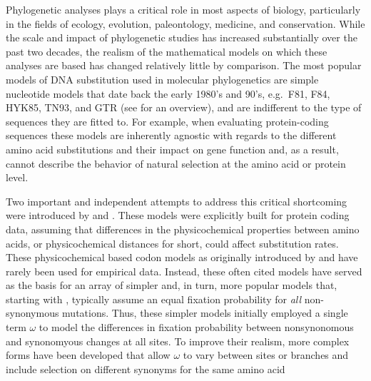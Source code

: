 \documentclass[12pt,letterpaper,fleqn]{article}
\renewcommand{\subsection}[1]{%
\bigskip
\begin{center}
\begin{large}
\normalfont\itshape #1
\end{large}
\end{center}}
\newcommand{\PC}{physicochemical\xspace}
\begin{document}
Phylogenetic analyses plays a critical role in most aspects of biology, particularly in the fields of ecology, evolution, paleontology, medicine, and conservation.
While the scale and impact of phylogenetic studies has increased substantially over the past two decades, the realism of the mathematical models on which these analyses are based has changed relatively little by comparison.
The most popular models of DNA substitution used in molecular phylogenetics are simple nucleotide models that date back the early 1980's and 90's, e.g.~F81, F84, HYK85, TN93, and GTR (see \citet{Yang2014} for an overview),  and are indifferent to the type of sequences they are fitted to.
For example, when evaluating protein-coding sequences these models are inherently agnostic with regards to the different amino acid substitutions and their impact on gene function and, as a result, cannot describe the behavior of natural selection at the amino acid or protein level.

Two important and independent attempts to address this critical shortcoming were introduced by \citet{GoldmanAndYang1994} and \citet{MuseAndGaut1994}.
These models were explicitly built for protein coding data, assuming that differences in the \PC properties between amino acids, or \PC distances for short, could affect substitution rates.
These \PC based codon models as originally introduced by \citet{GoldmanAndYang1994} and \citet{MuseAndGaut1994} have rarely been used for empirical data.
Instead, these often cited models have served as the basis for an array of simpler and, in turn, more popular models that, starting with \citet{YangAndNielsen1998,NielsenAndYang1998}, typically assume an equal fixation probability for \emph{all} non-synonymous mutations.
Thus, these simpler models initially employed a single term $\omega$ to model the differences in fixation probability between nonsynonomous and synonomyous changes at all sites.
To improve their realism, more complex forms have been developed that allow $\omega$ to vary between sites or branches \citep[as cited in ][]{Anisimova2012} and include selection on different synonyms for the same amino acid \cite[e.g.][]{YangAndNielsen2008} %
\end{document}
